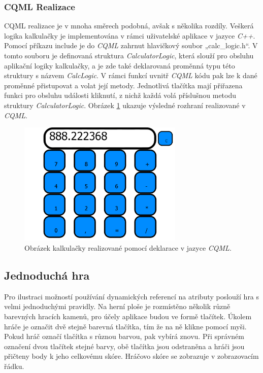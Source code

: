 \documentclass[11pt,twoside,a4paper]{book}
\begin{document}
{{\begin{ttemize}
{{\begin{lastlisting}[frame=single,caption=Řešení v pseudokódu problematického použití operátoru "." v přiřazovacím výroku,label=lst:var0N]
\subsubsection{CQML Realizace}
CQML realizace je v mnoha směrech podobná, avšak s několika rozdíly. Veškerá logika kalkulačky je implementována v rámci uživatelské aplikace v jazyce \textit{C++}. Pomocí příkazu include je do \textit{CQML} zahrnut hlavičkový soubor „calc_logic.h“. V tomto souboru je definovaná struktura \textit{CalculatorLogic}, která slouží pro obsluhu aplikační logiky kalkulačky, a je zde také deklarovaná proměnná typu této struktury s názvem \textit{CalcLogic}. V rámci funkcí uvnitř \textit{CQML} kódu pak lze k dané proměnné přistupovat a volat její metody. Jednotlivá tlačítka mají přiřazena funkci pro obsluhu události kliknutí, z nichž každá volá příslušnou metodu struktury \textit{CalculatorLogic}. Obrázek \ref{fig:outCalcCQML} ukazuje výsledné rozhraní realizované v \textit{CQML}.
\begin{figure}[!ht]
\begin{center}
  \includegraphics[width=0.7\textwidth]{cqmlCalc}
\caption{{\label{fig:outCalcCQML}}Obrázek kalkulačky realizované pomocí deklarace v jazyce \textit{CQML}.}
\end{center}
\end{figure}



\subsection{Jednoduchá hra}
Pro ilustraci možností používání dynamických referencí na atributy poslouží hra s velmi jednoduchými pravidly. Na herní ploše je rozmístěno několik různě barevných hracích kamenů, pro účely aplikace budou ve formě tlačítek. Úkolem hráče je označit dvě stejně barevná tlačítka, tím že na ně klikne pomocí myši. Pokud hráč označí tlačítka s různou barvou, pak vybírá znovu. Při správném označení dvou tlačítek stejné barvy, obě tlačítka jsou odstraněna a hráči jsou přičteny body k jeho celkovému skóre. Hráčovo skóre se zobrazuje v zobrazovacím řádku.

\end{lastlisting}}}
\end{ttemize}}}
\end{document}
